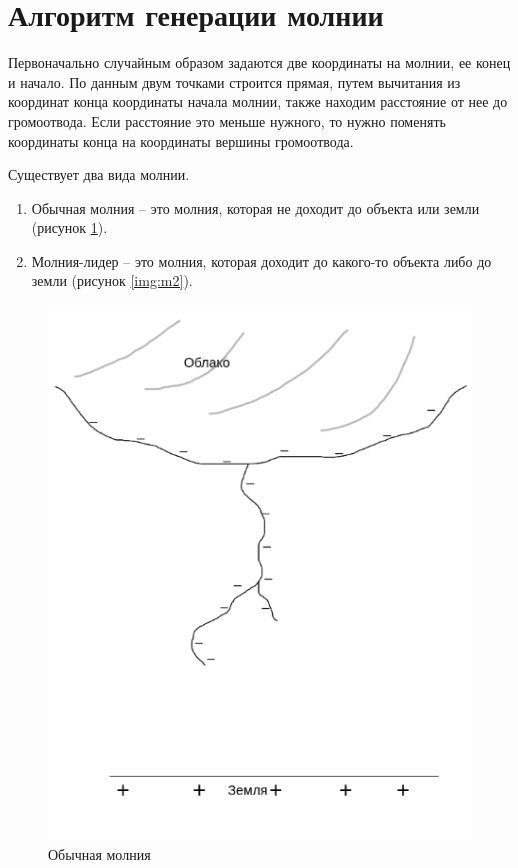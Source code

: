 \section{Алгоритм генерации молнии}
Первоначально случайным образом задаются две координаты на молнии, ее конец и начало. По данным двум точками строится прямая, путем вычитания из координат конца координаты начала молнии, также находим расстояние от нее до громоотвода. Если расстояние это меньше нужного, то нужно поменять координаты конца на координаты вершины громоотвода.

Существует два вида молнии.
\begin{enumerate}
	\item Обычная молния -- это молния, которая не доходит до объекта или земли (рисунок \ref{img:m1}).
	\item Молния-лидер -- это молния, которая доходит до какого-то объекта либо до земли (рисунок \ref{img:m2}). 
\end{enumerate}

\begin{figure}[h!]
	\begin{center}
		\includegraphics[scale=0.48]{img/m1.png}
	\end{center}
	\captionsetup{justification=centering}
	\caption{Обычная молния}
	\label{img:m1}
\end{figure}

